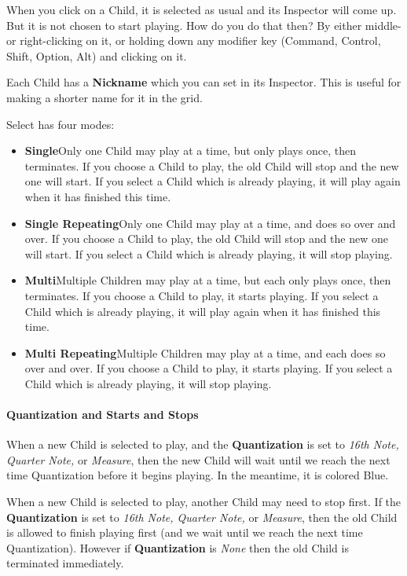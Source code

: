 \documentclass[twoside,10pt]{article}
\begin{document}
When you click on a Child, it is selected as usual and its Inspector will come up.  But it is not chosen to start playing.  How do you do that then?  By either middle- or right-clicking on it, or holding down any modifier key (Command, Control, Shift, Option, Alt) and clicking on it.

Each Child has a {\bf Nickname} which you can set in its Inspector.  This is useful for making a shorter name for it in the grid.



Select has four modes:

\begin{itemize}
\item{\bf Single}\quad Only one Child may play at a time, but only plays once, then terminates.  If you choose a Child to play, the old Child will stop and the new one will start.  If you select a Child which is already playing, it will play again when it has finished this time.
\item{\bf Single Repeating}\quad Only one Child may play at a time, and does so over and over.  If you choose a Child to play, the old Child will stop and the new one will start.  If you select a Child which is already playing, it will stop playing.
\item{\bf Multi}\quad Multiple Children may play at a time, but each only plays once, then terminates.  If you choose a Child to play, it starts playing.   If you select a Child which is already playing, it will play again when it has finished this time.
\item{\bf Multi Repeating}\quad Multiple Children may play at a time, and each does so over and over.  If you choose a Child to play, it starts playing.  If you select a Child which is already playing, it will stop playing.
\end{itemize}

\paragraph{Quantization and Starts and Stops}

When a new Child is selected to play, and the {\bf Quantization} is set to {\it 16th Note, Quarter Note,} or {\it Measure}, then the new Child will wait until we reach the next time Quantization before it begins playing.  In the meantime, it is colored Blue.

When a new Child is selected to play, another Child may need to stop first.   If the {\bf Quantization} is set to {\it 16th Note, Quarter Note,} or {\it Measure}, then the old Child is allowed to finish playing first (and we wait until we reach the next time Quantization).  However if {\bf Quantization} is {\it None} then the old Child is terminated immediately.
\end{document}
